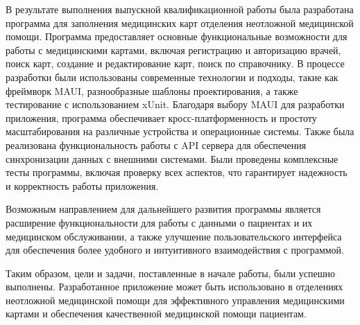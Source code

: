 \conclusion

В результате выполнения выпускной квалификационной работы была разработана программа для заполнения медицинских карт отделения неотложной медицинской помощи. Программа предоставляет основные функциональные возможности для работы с медицинскими картами, включая регистрацию и авторизацию врачей, поиск карт, создание и редактирование карт, поиск по справочнику. В процессе разработки были использованы современные технологии и подходы, такие как фреймворк MAUI, разнообразные шаблоны проектирования, а также тестирование с использованием xUnit. Благодаря выбору MAUI для разработки приложения, программа обеспечивает кросс-платформенность и простоту масштабирования на различные устройства и операционные системы. Также была реализована функциональность работы с API сервера для обеспечения синхронизации данных с внешними системами. Были проведены комплексные тесты программы, включая проверку всех аспектов, что гарантирует надежность и корректность работы приложения.

Возможным направлением для дальнейшего развития программы является расширение функциональности для работы с данными о пациентах и их медицинском обслуживании, а также улучшение пользовательского интерфейса для обеспечения более удобного и интуитивного взаимодействия с программой.

Таким образом, цели и задачи, поставленные в начале работы, были успешно выполнены. Разработанное приложение может быть использовано в отделениях неотложной медицинской помощи для эффективного управления медицинскими картами и обеспечения качественной медицинской помощи пациентам.